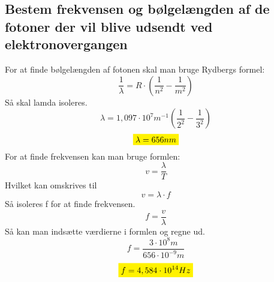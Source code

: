 \subsection{Bestem frekvensen og bølgelængden af de fotoner der vil blive udsendt ved elektronovergangen}
For at finde bølgelængden af fotonen skal man bruge Rydbergs formel: 
\begin{equation*}
    \frac{1}{\lambda}=R \cdot (\frac{1}{n^2} - \frac{1}{m^2} )
\end{equation*}
Så skal lamda isoleres. 
\begin{equation*}
    \lambda = 1,097 \cdot 10^7 m^{-1} (\frac{1}{2^2} - \frac{1}{3^2} )
\end{equation*}
\begin{equation*}
    \mathcolorbox{yellow}{\lambda = 656 nm}
\end{equation*}
For at finde frekvensen kan man bruge formlen:
\begin{equation*}
    v=\frac{\lambda}{T}
\end{equation*}
Hvilket kan omskrives til 
\begin{equation*}
    v=\lambda \cdot f
\end{equation*}
Så isoleres f for at finde frekvensen.
\begin{equation*}
    f=\frac{v}{\lambda}
\end{equation*}
Så kan man indsætte værdierne i formlen og regne ud.
\begin{equation*}
    f=\frac{3 \cdot 10^8 m}{656 \cdot 10^{-9} m}
\end{equation*}
\begin{equation*}
    \mathcolorbox{yellow}{f=4,584 \cdot 10^{14} Hz}
\end{equation*}
\newpage
